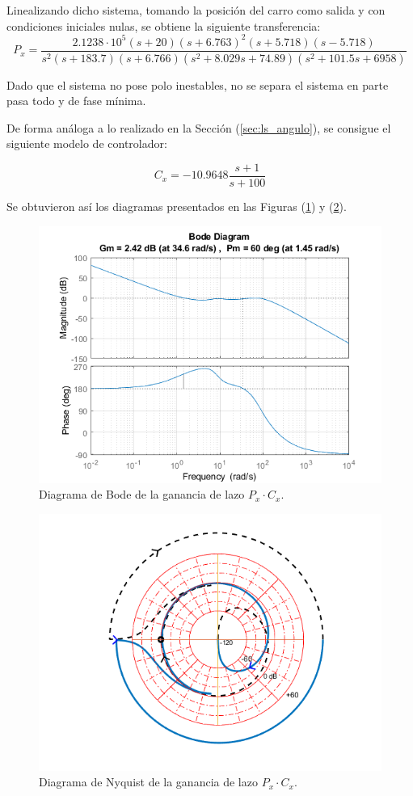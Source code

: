 Linealizando dicho sistema, tomando la posición del carro como salida y con condiciones iniciales nulas, se obtiene la siguiente transferencia:
\begin{equation*}
	P_{x} = \frac{2.1238 \cdot {10}^5 (s+20) (s+6.763)^2 (s+5.718) (s-5.718)}{s^2 (s+183.7) (s+6.766) (s^2 + 8.029 s + 74.89) (s^2 + 101.5 s + 6958)}	
\end{equation*}

Dado que el sistema no pose polo inestables, no se separa el sistema en parte pasa todo y de fase mínima.

De forma análoga a lo realizado en la Sección (\ref{sec:ls_angulo}), se consigue el siguiente modelo de controlador:

\begin{equation*}
	C_{x} = -10.9648 \frac{s + 1}{s + 100}	
\end{equation*}

Se obtuvieron así los diagramas presentados en las Figuras (\ref{fig:bode_x}) y (\ref{fig:nyqlog_x}).

\begin{figure}[H]
	\centering
	\includegraphics[width=0.8\linewidth]{ImagenesLoop Shaping/Bode_x}
	\caption{Diagrama de Bode de la ganancia de lazo $P_x \cdot C_x$.}	
	\label{fig:bode_x}
\end{figure}
\begin{figure}[H]
	\centering
	\includegraphics[width=0.7\linewidth]{ImagenesLoop Shaping/Nyqlog_x}
	\caption{Diagrama de Nyquist de la ganancia de lazo $P_x \cdot C_x$.}	
	\label{fig:nyqlog_x}
\end{figure}

